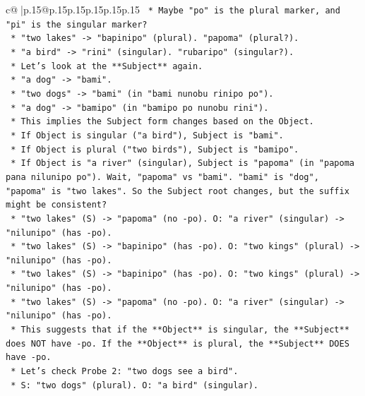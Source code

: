 \documentclass{article}
\begin{document}
{\begin{supertabular}{c@{$\;$}|p{.15\linewidth}@{}p{.15\linewidth}p{.15\linewidth}p{.15\linewidth}p{.15\linewidth}p{.15\linewidth}}
{{{\texttt{            *   Maybe "po" is the plural marker, and "pi" is the singular marker?} \\
\texttt{                *   "two lakes" {-}> "bapinipo" (plural). "papoma" (plural?).} \\
\texttt{                *   "a bird" {-}> "rini" (singular). "rubaripo" (singular?).} \\
\texttt{            *   Let's look at the **Subject** again.} \\
\texttt{                *   "a dog" {-}> "bami".} \\
\texttt{                *   "two dogs" {-}> "bami" (in "bami nunobu rinipo po").} \\
\texttt{                *   "a dog" {-}> "bamipo" (in "bamipo po nunobu rini").} \\
\texttt{                *   This implies the Subject form changes based on the Object.} \\
\texttt{                *   If Object is singular ("a bird"), Subject is "bami".} \\
\texttt{                *   If Object is plural ("two birds"), Subject is "bamipo".} \\
\texttt{                *   If Object is "a river" (singular), Subject is "papoma" (in "papoma pana nilunipo po"). Wait, "papoma" vs "bami". "bami" is "dog", "papoma" is "two lakes". So the Subject root changes, but the suffix might be consistent?} \\
\texttt{                *   "two lakes" (S) {-}> "papoma" (no {-}po). O: "a river" (singular) {-}> "nilunipo" (has {-}po).} \\
\texttt{                *   "two lakes" (S) {-}> "bapinipo" (has {-}po). O: "two kings" (plural) {-}> "nilunipo" (has {-}po).} \\
\texttt{                *   "two lakes" (S) {-}> "bapinipo" (has {-}po). O: "two kings" (plural) {-}> "nilunipo" (has {-}po).} \\
\texttt{                *   "two lakes" (S) {-}> "papoma" (no {-}po). O: "a river" (singular) {-}> "nilunipo" (has {-}po).} \\
\texttt{                *   This suggests that if the **Object** is singular, the **Subject** does NOT have {-}po. If the **Object** is plural, the **Subject** DOES have {-}po.} \\
\texttt{                *   Let's check Probe 2: "two dogs see a bird".} \\
\texttt{                    *   S: "two dogs" (plural). O: "a bird" (singular).} \\
}}}
\end{supertabular}}
\end{document}
